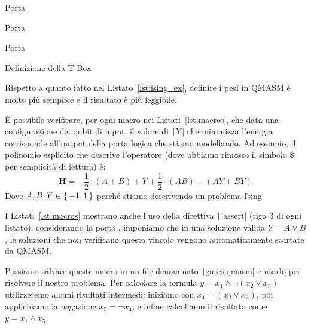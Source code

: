 \begin{listingenv}[h]
	\centering
	\begin{sublisting}[c]{0.28\linewidth}
		\caption{Porta }
		\label{lst:and_gate}
	\end{sublisting}
	\quad
	\begin{sublisting}[c]{0.28\linewidth}
		\caption{Porta }
		\label{lst:not_gate}
	\end{sublisting}
	\quad
	\begin{sublisting}[c]{0.28\linewidth}
		\caption{Porta }
		\label{lst:or_gate}
	\end{sublisting}
	\caption{Definizione della T-Box}
	\label{lst:macros}
\end{listingenv}

Rispetto a quanto fatto nel Listato~\ref{lst:ising_ex}, definire i pesi in QMASM è molto più semplice e il risultato è più leggibile.

È possibile verificare, per ogni macro nei Listati~\ref{lst:macros}, che data una configurazione dei qubit di input, il valore di \texttt|Y| che minimizza l'energia corrisponde all'output della porta logica che stiamo modellando. Ad esempio, il polinomio esplicito che descrive l'operatore  (dove abbiamo rimosso il simbolo $\$$ per semplicità di lettura) è:
\[
\mathbf{H} = -\frac{1}{2}\cdot(A + B) + Y + \frac{1}{2}\cdot(AB) - (AY + BY)
\]
Dove $A, B, Y \in \set{-1, 1}$ perché stiamo descrivendo un problema Ising.

I Listati~\ref{lst:macros} mostrano anche l'uso della direttiva \texttt|!assert| (riga $3$ di ogni listato): considerando la porta , imponiamo che in una soluzione valida $Y = A \lor B$, le soluzioni che non verificano questo vincolo vengono automaticamente scartate da QMASM.

Possiamo salvare queste macro in un file denominato \texttt|gates.qmasm| e usarlo per risolvere il nostro problema. Per calcolare la formula $y = x_1 \land \neg(x_2 \lor x_3)$ utilizzeremo alcuni risultati intermedi: iniziamo con $x_4 = (x_2 \lor x_3)$, poi applichiamo la negazione $x_5 = \neg x_4$, e infine calcoliamo il risultato come $y = x_1 \land x_5$. 

